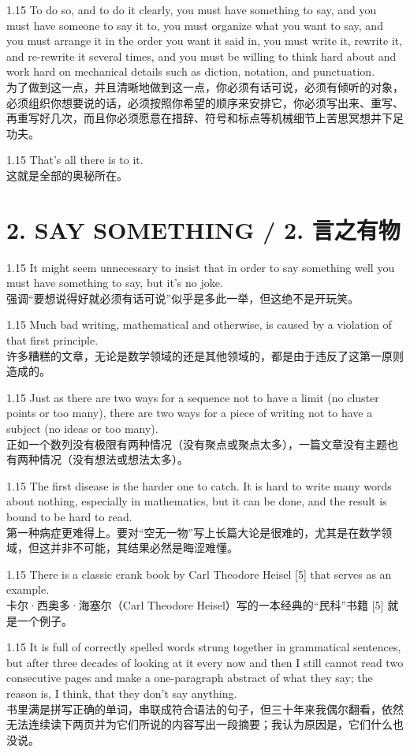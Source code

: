 \documentclass[12pt,a4paper]{article}
\newcommand{\bilingual}[2]{
    \begin{spacing}{1.15} %
        \noindent \normalsize #1 \\[-0.5ex] %
        \small \textcolor{blue!70!black}{#2} %
    \end{spacing}
    \vspace{0.8em} %
}
\begin{document}
\bilingual{To do so, and to do it clearly, you must have something to say, and you must have someone to say it to, you must organize what you want to say, and you must arrange it in the order you want it said in, you must write it, rewrite it, and re-rewrite it several times, and you must be willing to think hard about and work hard on mechanical details such as diction, notation, and punctuation.}
{为了做到这一点，并且清晰地做到这一点，你必须有话可说，必须有倾听的对象，必须组织你想要说的话，必须按照你希望的顺序来安排它，你必须写出来、重写、再重写好几次，而且你必须愿意在措辞、符号和标点等机械细节上苦思冥想并下足功夫。} %

\bilingual{That's all there is to it.}
{这就是全部的奥秘所在。} %


\section*{2. SAY SOMETHING / 2. 言之有物} %

\bilingual{It might seem unnecessary to insist that in order to say something well you must have something to say, but it's no joke.}
{强调“要想说得好就必须有话可说”似乎是多此一举，但这绝不是开玩笑。} %

\bilingual{Much bad writing, mathematical and otherwise, is caused by a violation of that first principle.}
{许多糟糕的文章，无论是数学领域的还是其他领域的，都是由于违反了这第一原则造成的。} %

\bilingual{Just as there are two ways for a sequence not to have a limit (no cluster points or too many), there are two ways for a piece of writing not to have a subject (no ideas or too many).}
{正如一个数列没有极限有两种情况（没有聚点或聚点太多），一篇文章没有主题也有两种情况（没有想法或想法太多）。} %

\bilingual{The first disease is the harder one to catch. It is hard to write many words about nothing, especially in mathematics, but it can be done, and the result is bound to be hard to read.}
{第一种病症更难得上。要对“空无一物”写上长篇大论是很难的，尤其是在数学领域，但这并非不可能，其结果必然是晦涩难懂。} %

\bilingual{There is a classic crank book by Carl Theodore Heisel [5] that serves as an example.}
{卡尔·西奥多·海塞尔（Carl Theodore Heisel）写的一本经典的“民科”书籍 [5] 就是一个例子。} %

\bilingual{It is full of correctly spelled words strung together in grammatical sentences, but after three decades of looking at it every now and then I still cannot read two consecutive pages and make a one-paragraph abstract of what they say; the reason is, I think, that they don't say anything.}
{书里满是拼写正确的单词，串联成符合语法的句子，但三十年来我偶尔翻看，依然无法连续读下两页并为它们所说的内容写出一段摘要；我认为原因是，它们什么也没说。} %
\end{document}
